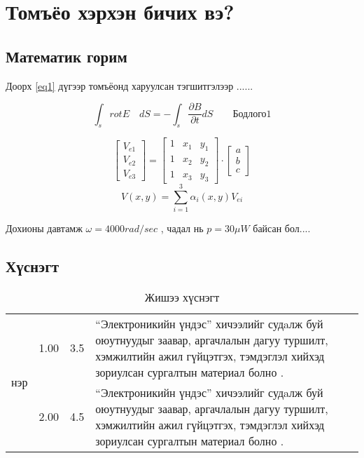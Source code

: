 \chapter{Томъёо хэрхэн бичих вэ?} %

\label{Chapter5} %
\pagecolor{white}

\section{Математик горим}

Доорх \ref{eq1} дүгээр томъёонд харуулсан тэгшитгэлээр ......\cite{zorigt1}
 

\begin{equation}
\int_{s}^{}rot E \quad dS=-\int_{s}\frac{\partial B}{\partial t}dS  \qquad \textit{Бодлого1}
\label{eq1}
\end{equation}

\[ 
\begin{bmatrix}
V_{e1} \\
V_{e2} \\
V_{e3} 
\end{bmatrix}=
\begin{bmatrix}
1 & x_1 & y_1 \\
1 & x_2 & y_2 \\
1 & x_3 & y_3
\end{bmatrix}
\cdot \begin{bmatrix}
a \\
b \\
c
\end{bmatrix}\]
\[
V(x,y)=\sum_{i=1}^{3}\alpha_i(x,y)V_{ei}
\]


Дохионы давтамж $\omega=4000 rad/sec$ , чадал нь $p=30\mu W $ байсан бол.... \cite{uguulel}


\section{Хүснэгт}

\begin{table}[!ht]
	\centering
	\caption{Жишээ хүснэгт}
	\label{table1}
	
	\begin{tabular}{|p{2cm}|p{2cm}|p{2cm}|p{7.5cm}|}
	\hline
		\multirow{2}{*}{ нэр} & 1.00 & 3.5& “Электроникийн үндэс” хичээлийг судaлж буй оюутнуудыг заавар, аргачлалын дагуу туршилт, хэмжилтийн ажил гүйцэтгэх, тэмдэглэл хийхэд зориулсан сургалтын материал болно \cite{online1}. \\
	  & 2.00 & 4.5& “Электроникийн үндэс” хичээлийг судaлж буй оюутнуудыг заавар, аргачлалын дагуу туршилт, хэмжилтийн ажил гүйцэтгэх, тэмдэглэл хийхэд зориулсан сургалтын материал болно \cite{vhdl}. \\
	\hline
\end{tabular}	

\end{table}


	
